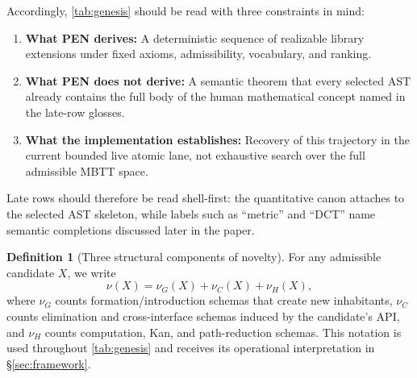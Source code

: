 \documentclass[11pt,a4paper]{article}
\theoremstyle{plain}
\theoremstyle{definition}
\newtheorem{definition}[theorem]{Definition}
\theoremstyle{remark}
\begin{document}
Accordingly, \cref{tab:genesis} should be read with three constraints in mind:
\begin{enumerate}[nosep]
    \item \textbf{What PEN derives:} A deterministic sequence of realizable library extensions under fixed axioms, admissibility, vocabulary, and ranking.
    \item \textbf{What PEN does not derive:} A semantic theorem that every selected AST already contains the full body of the human mathematical concept named in the late-row glosses.
    \item \textbf{What the implementation establishes:} Recovery of this trajectory in the current bounded live atomic lane, not exhaustive search over the full admissible MBTT space.
\end{enumerate}
Late rows should therefore be read shell-first: the quantitative canon attaches to the selected AST skeleton, while labels such as ``metric'' and ``DCT'' name semantic completions discussed later in the paper.

\begin{definition}[Three structural components of novelty]
\label{def:nu-components-preview}
For any admissible candidate $X$, we write
\[
  \nu(X) = \nu_G(X) + \nu_C(X) + \nu_H(X),
\]
where $\nu_G$ counts formation/introduction schemas that create new inhabitants, $\nu_C$ counts elimination and cross-interface schemas induced by the candidate's API, and $\nu_H$ counts computation, Kan, and path-reduction schemas.
This notation is used throughout \cref{tab:genesis} and receives its operational interpretation in \S\ref{sec:framework}.
\end{definition}
\end{document}
